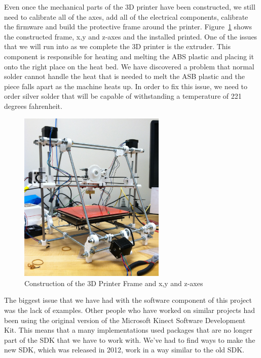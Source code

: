 \documentclass[12pt,twocolumn]{article}
\begin{document}
\indent Even once the mechanical parts of the 3D printer have been constructed, we still need to calibrate all of the axes, add all of the electrical components, calibrate the firmware and build the protective frame around the printer. Figure~\ref{basebuilt} shows the constructed frame, x,y and z-axes and the installed printed. One of the issues that we will run into as we complete the 3D printer is the extruder. This component is responsible for heating and melting the ABS plastic and placing it onto the right place on the heat bed. We have discovered a problem that normal solder cannot handle the heat that is needed to melt the ASB plastic and the piece falls apart as the machine heats up. In order to fix this issue, we need to order silver solder that will be capable of withstanding a temperature of 221 degrees fahrenheit. 
\begin{figure}[H]
\centering
\includegraphics[width=70mm]{photo.JPG}
\caption{Construction of the 3D Printer Frame and x,y and z-axes}
\label{basebuilt}
\end{figure}

\indent 
The biggest issue that we have had with the software component of this project was the lack of examples. Other people who have worked on similar projects had been using the original version of the Microsoft Kinect Software Development Kit. This means that a many implementations used packages that are no longer part of the SDK that we have to work with. We've had to find ways to make the new SDK, which was released in 2012, work in a way similar to the old SDK. 
\end{document}
